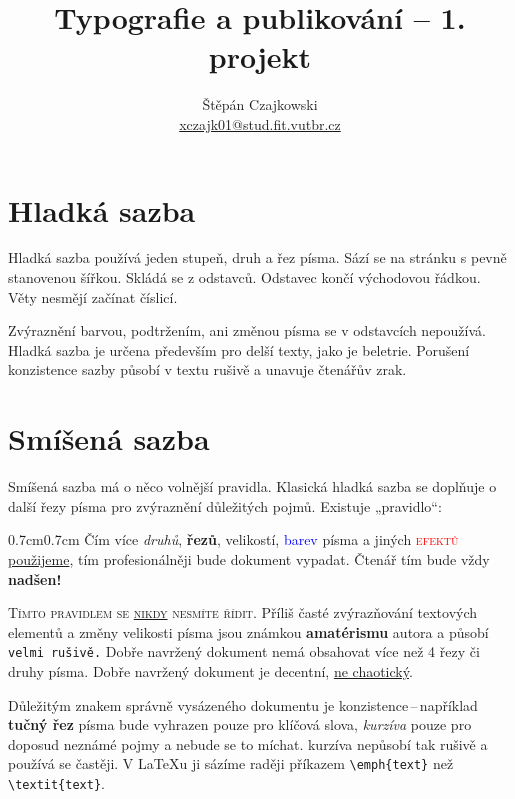 \documentclass[twocolumn]{article}
\title{Typografie a publikování -- 1. projekt}
\author{Štěpán Czajkowski \\ \href{mailto:xczajk01@stud.fit.vutbr.cz}{xczajk01@stud.fit.vutbr.cz}}
\date{\vspace{-4ex}}
\begin{document}
\maketitle

\section{Hladká sazba}

Hladká sazba používá jeden stupeň, druh a řez písma.
Sází se na stránku s pevně stanovenou šířkou.
Skládá se z odstavců. Odstavec končí východovou řádkou.
Věty nesmějí začínat číslicí.

Zvýraznění barvou, podtržením, ani změnou písma se v odstavcích nepoužívá.
Hladká sazba je určena především pro delší texty, jako je beletrie.
Porušení konzistence sazby působí v textu rušivě a unavuje čtenářův zrak.


\section{Smíšená sazba}

Smíšená sazba má o něco volnější pravidla.
Klasická hladká sazba se doplňuje o další řezy písma pro zvýraznění důležitých pojmů.
Existuje „pravidlo“:

\begin{adjustwidth}{0.7cm}{0.7cm}
    \quad Čím více \emph{druhů}, \textbf{řezů}, {\huge velikostí}, \textcolor{blue}{barev}  písma a jiných \textcolor{red}{\textsc{efektů}} \underline{použijeme}, tím {\color{orange}profesionálněji} bude {\selectfont \Large dokument} vypadat. {\tiny Čtenář} tím bude vždy {\Huge \textbf{nadšen!}}
\end{adjustwidth}



\textsc{Tímto pravidlem se \underline{nikdy} nesmíte řídit.}
Příliš časté zvýrazňování textových elementů a změny {\tiny velikosti} písma jsou známkou \textbf{amatérismu} autora a působí \texttt{velmi rušivě.}
Dobře navržený dokument nemá obsahovat více než 4 řezy či druhy písma.
Dobře navržený dokument je decentní, \underline{ne chaotický}.

Důležitým znakem správně vysázeného dokumentu je konzistence\,--\,například \textbf{tučný řez} písma bude vyhrazen pouze pro klíčová slova, \emph{kurzíva} pouze pro doposud neznámé pojmy a nebude se to míchat.
kurzíva nepůsobí tak rušivě a používá se častěji.
V \LaTeX u ji sázíme raději příkazem \verb |\emph{text}| než \verb|\textit{text}|.
\end{document}
